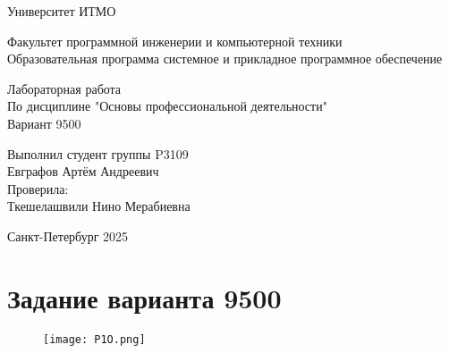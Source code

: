 

\thispagestyle{empty}
\begin{center}
\LARGE{Университет ИТМО} 
\vspace{20pt}

\LARGE{Факультет программной инженерии и компьютерной техники \\
Образовательная программа системное и прикладное программное обеспечение}
\vspace{160pt}

\LARGE{Лабораторная работа   \\
По дисциплине "Основы профессиональной деятельности" \\ 
Вариант 9500}
\vspace{120pt}
\end{center}

\begin{flushright}
\LARGE{Выполнил студент группы P3109 \\ 
Евграфов Артём Андреевич \\
Проверила: \\
Ткешелашвили Нино Мерабиевна}
\vspace{120pt}
\end{flushright}

\begin{center}
\Large{Санкт-Петербург 2025}
\end{center}

\newpage
\setcounter{page}{1}
\tableofcontents
\newpage
\section{Задание варианта 9500}
\begin{figure}[H]
    \centering
    \texttt{[image: P1O.png]}
\end{figure}
